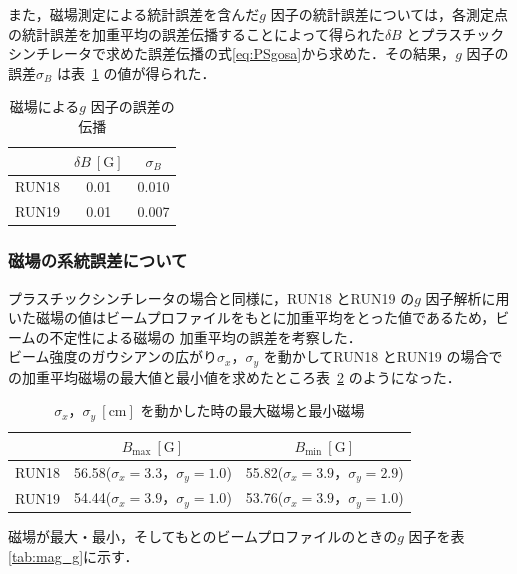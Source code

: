 また，磁場測定による統計誤差を含んだ$g$ 因子の統計誤差については，各測定点の統計誤差を加重平均の誤差伝播することによって得られた$\delta B$ とプラスチックシンチレータで求めた誤差伝播の式\eqref{eq:PSgosa}から求めた．その結果，$g$ 因子の誤差$\sigma_{B}$ は表~\ref{tab:g_error} の値が得られた．

\begin{table}[H]%
\caption{磁場による$g$ 因子の誤差の伝播}
\centering
\begin{tabular}{ccc}\toprule
{} & $\delta B~[\mathrm{G}]$ &  $\sigma_{B}$  \\ \midrule
RUN18 & 0.01 & 0.010  \\
RUN19 & 0.01 & 0.007 \\ \bottomrule
\end{tabular}
\label{tab:g_error}
\end{table}


\subsubsection{磁場の系統誤差について}

プラスチックシンチレータの場合と同様に，RUN18 とRUN19 の$g$ 因子解析に用いた磁場の値はビームプロファイルをもとに加重平均をとった値であるため，ビームの不定性による磁場の
加重平均の誤差を考察した．\\
ビーム強度のガウシアンの広がり$\sigma_{x}，\sigma_{y}$ を動かしてRUN18 とRUN19 の場合での加重平均磁場の最大値と最小値を求めたところ表~\ref{tab:mag_max_min} のようになった．

\begin{table}[H]
\caption{$\sigma_{x}，\sigma_{y}~[\mathrm{cm}]$ を動かした時の最大磁場と最小磁場}
\centering
\begin{tabular}{ccc}\toprule%
{} & $B_\mathrm{max}~[\mathrm{G}]$ &  $B_\mathrm{min}~[\mathrm{G}]$   \\ \midrule
RUN18 & 56.58\;($\sigma_{x}=3.3，\sigma_{y}=1.0$) & 55.82\;($\sigma_{x}=3.9，\sigma_{y}=2.9$)  \\
RUN19 & 54.44\;($\sigma_{x}=3.9，\sigma_{y}=1.0$) & 53.76\;($\sigma_{x}=3.9，\sigma_{y}=1.0$) \\ \bottomrule
\end{tabular}
\label{tab:mag_max_min}
\end{table}

磁場が最大・最小，そしてもとのビームプロファイルのときの$g$ 因子を表\ref{tab:mag_g}に示す．


